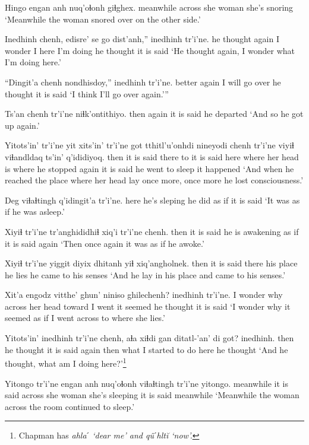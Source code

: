 \documentclass[12pt]{article}
\begin{document}
\gll Hingo engan  anh nuq'oɬonh giɬghex.
meanwhile across  she woman {she's snoring}
\glt `Meanwhile the woman snored over on the other side.'
\glend

\gll Inedhinh chenh, edisre' se go dist'anh,'' inedhinh tr'i'ne.
{he thought} again  {I wonder} I here {I'm doing} {he thought} {it is said}
\glt `He thought again, I wonder what I'm doing here.'
\glend

\gll ``Dingit'a chenh  nondhisdoy,'' inedhinh tr'i'ne.
better  again {I will go over} {he thought} {it is said}
\glt `I think I'll go over again.'''
\glend

\gll Ts'an chenh tr'i'ne niɬk'ontithiyo.
then again {it is said} {he departed}
\glt `And so he got up again.'
\glend

\gll Yitots'in' tr'i'ne yit xits'in' tr'i'ne got tthitl'u'onhdi nineyodi  chenh  tr'i'ne {viyiɬ viɬandldaq} ts'in' q'ididiyoq.
then  {it is said} there to  {it is said} here {where her head is} {where he stopped} again {it is said} {he went to sleep} {} {it happened}
\glt `And when he reached the place where her head lay once more, once more he lost consciousness.'
\glend

\gll Deg viɬaɬtingh q'idingit'a tr'i'ne.
here {he's sleping} {he did as if} {it is said}
\glt `It was as if he was asleep.'
\glend

\gll Xiyiɬ tr'i'ne tr'anghididhiɬ xiq'i tr'i'ne chenh.
then {it is said} {he is awakening} {as if} {it is said} again
\glt `Then once again it was as if he awoke.'
\glend

\gll Xiyiɬ tr'i'ne yiggit diyix  dhitanh {yiɬ xiq'angholnek.}
then {it is said} there {his place} {he lies} {he came to his senses}
\glt `And he lay in his place and came to his senses.'
\glend

\gll Xit'a engodz vitthe' ghun'  niniso ghilechenh? inedhinh tr'i'ne.
{I wonder why} across {her head} toward  {I went} {it seemed } {he thought} {it is said}
\glt `I wonder why it seemed as if I went across to where she lies.'
\glend

\gll Yitots'in' inedhinh tr'i'ne chenh,  {aɬa xiɬdi} gan ditatl-'an'  di got?  inedhinh.
then  {he thought} {it is said} again then what {I started to do} {}  here  {he thought}
\glt `And he thought, what am I doing here?'\footnote{Chapman has \em ahlaˊ \em `dear me' and \em q\^{u}ˊhlt\u{i} \em `now'.}
\glend

\gll Yitongo tr'i'ne  engan  anh nuq'oɬonh viɬaɬtingh tr'i'ne yitongo.
meanwhile {it is said} across  she woman {she's sleeping} {it is said} meanwhile
\glt `Meanwhile the woman across the room continued to sleep.'
\glend
\end{document}
